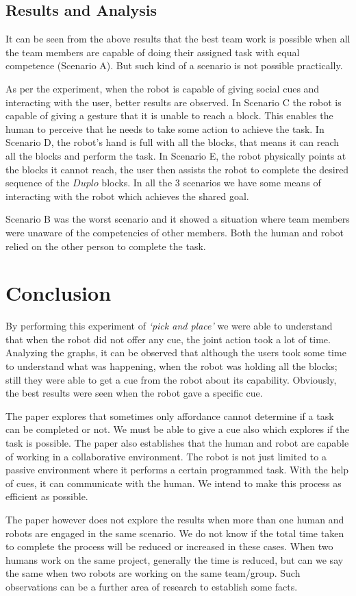 \documentclass[letterpaper,12pt]{article}
\begin{document}
\normalsize

\subsection{Results and Analysis}
It can be seen from the above results that the best team work is possible when all the team members are capable of doing their assigned task with equal competence (Scenario A). But such kind of a scenario is not possible practically.
\par
\indent As per the experiment, when the robot is capable of giving social cues and interacting with the user, better results are observed. In Scenario C the robot is capable of giving a gesture that it is unable to reach a block. This enables the human to perceive that he needs to take some action to achieve the task. In Scenario D, the robot's hand is full with all the blocks, that means it can reach all the blocks and perform the task. In Scenario E, the robot physically points at the blocks it cannot reach, the user then assists the robot to complete the desired sequence of the $Duplo$ blocks. In all the 3 scenarios we have some means of interacting with the robot which achieves the shared goal.
\par
\indent Scenario B was the worst scenario and it showed a situation where team members were unaware of the competencies  of other members. Both the human and robot relied on the other person to complete the task.

\section{Conclusion}
By performing this experiment of \textit{`pick and place'} we were able to understand that when the robot did not offer any cue, the joint action took a lot of time. Analyzing the graphs, it can be observed that although the users took some time to understand what was happening, when the robot was holding all the blocks; still they were able to get a cue from the robot about its capability. Obviously, the best results were seen when the robot gave a specific cue.
\par The paper explores that sometimes only affordance cannot determine if a task can be completed or not. We must be able to give a cue also which explores if the task is possible. The paper also establishes that the human and robot are capable of working in a collaborative environment. The robot is not just limited to a passive environment where it performs a certain programmed task. With the help of cues, it can communicate with the human. We intend to make this process as efficient as possible.
\par
The paper however does not explore the results when more than one human and robots are engaged in the same scenario. We do not know if the total time taken to complete the process will be reduced or increased in these cases. When two humans work on the same project, generally the time is reduced, but can we say the same when two robots are working on the same team/group. Such observations can be a further area of research to establish some facts.
\end{document}
